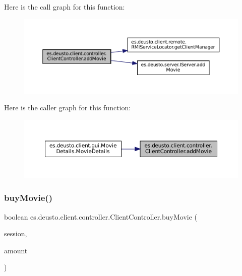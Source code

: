 Here is the call graph for this function\+:
\nopagebreak
\begin{figure}[H]
\begin{center}
\leavevmode
\includegraphics[width=350pt]{classes_1_1deusto_1_1client_1_1controller_1_1_client_controller_a095a09ed143856ea25f51749de71f279_cgraph}
\end{center}
\end{figure}
Here is the caller graph for this function\+:
\nopagebreak
\begin{figure}[H]
\begin{center}
\leavevmode
\includegraphics[width=350pt]{classes_1_1deusto_1_1client_1_1controller_1_1_client_controller_a095a09ed143856ea25f51749de71f279_icgraph}
\end{center}
\end{figure}
\mbox{\label{classes_1_1deusto_1_1client_1_1controller_1_1_client_controller_a92f0a66750a4f02c11de68814bc0d96f}} 
\subsubsection{\texorpdfstring{buyMovie()}{buyMovie()}}
{\footnotesize\ttfamily boolean es.\+deusto.\+client.\+controller.\+Client\+Controller.\+buy\+Movie (\begin{DoxyParamCaption}\item[{\mbox{\hyperlink{classes_1_1deusto_1_1server_1_1data_1_1_session_d_t_o}{Session\+D\+TO}}}]{session,  }\item[{int}]{amount }\end{DoxyParamCaption})}



